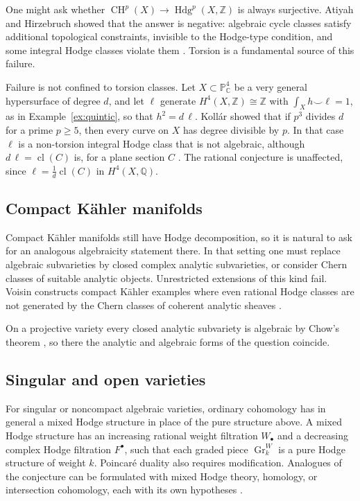 \documentclass[11pt,reqno]{amsart}
\theoremstyle{definition}
\theoremstyle{remark}
\numberwithin{equation}{section}
\newcommand{\C}{\mathbb{C}}
\newcommand{\Z}{\mathbb{Z}}
\newcommand{\Q}{\mathbb{Q}}
\newcommand{\PP}{\mathbb{P}}
\DeclareMathOperator{\CH}{CH}
\DeclareMathOperator{\Hdg}{Hdg}
\DeclareMathOperator{\cl}{cl}
\begin{document}
One might ask whether $\CH^p(X)\to\Hdg^p(X,\Z)$ is always surjective.
Atiyah and Hirzebruch showed that the answer is negative: algebraic cycle
classes satisfy additional topological constraints, invisible to the
Hodge-type condition, and some integral Hodge classes violate them
\cite{atiyahhirzebruch1962}. Torsion is a fundamental source of this failure.

Failure is not confined to torsion classes. Let $X\subset\PP^4_{\C}$ be a
very general hypersurface of degree $d$, and let $\ell$ generate
$H^4(X,\Z)\cong\Z$ with $\int_X h\smile\ell=1$, as in
Example~\ref{ex:quintic}, so that $h^2=d\,\ell$. Koll\'ar showed that if
$p^3$ divides $d$ for a prime $p\geq5$, then every curve on $X$ has degree
divisible by $p$. In that case $\ell$ is a non-torsion integral Hodge class
that is not algebraic, although $d\,\ell=\cl(C)$ is, for a plane section
$C$ \cite{voisin2006integral}. The rational conjecture is unaffected, since
$\ell=\tfrac1d\cl(C)$ in $H^4(X,\Q)$.

\subsection{Compact K\"ahler manifolds}

Compact K\"ahler manifolds still have Hodge decomposition, so it is
natural to ask for an analogous algebraicity statement there. In that
setting one must replace algebraic subvarieties by closed complex
analytic subvarieties, or consider Chern classes of suitable analytic
objects. Unrestricted extensions of this kind fail. Voisin constructs
compact K\"ahler examples where even rational Hodge classes are not
generated by the Chern classes of coherent analytic sheaves
\cite{voisin2002kahler}.

On a projective variety every closed analytic subvariety is algebraic by
Chow's theorem \cite{chow1949,gaganotes}, so there the analytic and algebraic
forms of the question coincide.

\subsection{Singular and open varieties}

For singular or noncompact algebraic varieties, ordinary cohomology has
in general a mixed Hodge structure in place of the pure structure above.
A mixed Hodge structure has an increasing rational weight filtration
$W_\bullet$ and a decreasing complex Hodge filtration $F^\bullet$,
such that each graded piece $\operatorname{Gr}^W_k$ is a pure Hodge
structure of weight $k$.
Poincar\'e duality also requires modification. Analogues of the conjecture
can be formulated with mixed Hodge theory, homology, or intersection
cohomology, each with its own hypotheses \cite{voisin2003hodge2,voisin2025coniveau}.
\end{document}
